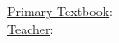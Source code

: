 \documentclass[11 pt, twoside]{article}
\begin{document}
\title{}
\author{Avery Karlin}
\date{}

\maketitle
\newpage
\tableofcontents
\vspace{11pt}
\noindent
\underline{Primary Textbook}: \\
\underline{Teacher}:
\newpage
\end{document}
